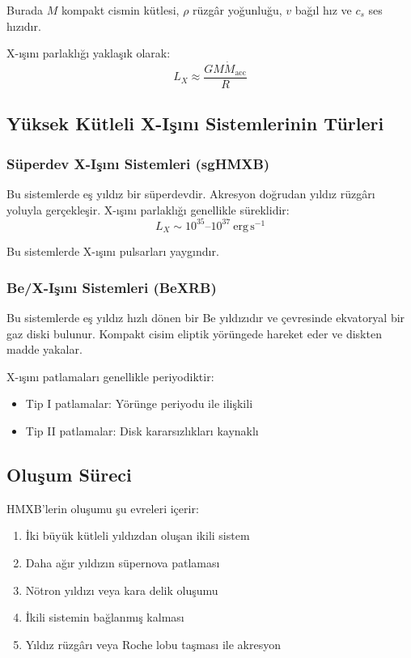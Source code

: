 Burada $M$ kompakt cismin kütlesi, $\rho$ rüzgâr yoğunluğu, $v$ bağıl hız ve $c_s$ ses hızıdır.

X-ışını parlaklığı yaklaşık olarak:
\begin{equation}
L_X \approx \frac{GM\dot{M}_{\mathrm{acc}}}{R}
\end{equation}

\subsection{Yüksek Kütleli X-Işını Sistemlerinin Türleri}

\subsubsection{Süperdev X-Işını Sistemleri (sgHMXB)}

Bu sistemlerde eş yıldız bir süperdevdir. Akresyon doğrudan yıldız rüzgârı yoluyla gerçekleşir. X-ışını parlaklığı genellikle süreklidir:
\begin{equation}
L_X \sim 10^{35} \text{--} 10^{37}\ \mathrm{erg\,s^{-1}}
\end{equation}

Bu sistemlerde X-ışını pulsarları yaygındır.

\subsubsection{Be/X-Işını Sistemleri (BeXRB)}

Bu sistemlerde eş yıldız hızlı dönen bir Be yıldızıdır ve çevresinde ekvatoryal bir gaz diski bulunur. Kompakt cisim eliptik yörüngede hareket eder ve diskten madde yakalar.

X-ışını patlamaları genellikle periyodiktir:
\begin{itemize}
    \item Tip I patlamalar: Yörünge periyodu ile ilişkili
    \item Tip II patlamalar: Disk kararsızlıkları kaynaklı
\end{itemize}

\subsection{Oluşum Süreci}

HMXB'lerin oluşumu şu evreleri içerir:
\begin{enumerate}
    \item İki büyük kütleli yıldızdan oluşan ikili sistem
    \item Daha ağır yıldızın süpernova patlaması
    \item Nötron yıldızı veya kara delik oluşumu
    \item İkili sistemin bağlanmış kalması
    \item Yıldız rüzgârı veya Roche lobu taşması ile akresyon
\end{enumerate}

